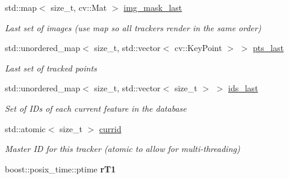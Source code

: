 \begin{DoxyCompactItemize}
\mbox{\label{classov__core_1_1TrackBase_a744c43a93a6e4b5cbd9551280e6a1c97}} 
std\+::map$<$ size\+\_\+t, cv\+::\+Mat $>$ \hyperlink{classov__core_1_1TrackBase_a744c43a93a6e4b5cbd9551280e6a1c97}{img\+\_\+mask\+\_\+last}
\begin{DoxyCompactList}\small\item\em Last set of images (use map so all trackers render in the same order) \end{DoxyCompactList}\item 
\mbox{\label{classov__core_1_1TrackBase_ad44a9e0c34c63b477be5fd2a63a6fb61}} 
std\+::unordered\+\_\+map$<$ size\+\_\+t, std\+::vector$<$ cv\+::\+Key\+Point $>$ $>$ \hyperlink{classov__core_1_1TrackBase_ad44a9e0c34c63b477be5fd2a63a6fb61}{pts\+\_\+last}
\begin{DoxyCompactList}\small\item\em Last set of tracked points \end{DoxyCompactList}\item 
\mbox{\label{classov__core_1_1TrackBase_aaf73cf7b7fd410d8532733875154ed2f}} 
std\+::unordered\+\_\+map$<$ size\+\_\+t, std\+::vector$<$ size\+\_\+t $>$ $>$ \hyperlink{classov__core_1_1TrackBase_aaf73cf7b7fd410d8532733875154ed2f}{ids\+\_\+last}
\begin{DoxyCompactList}\small\item\em Set of I\+Ds of each current feature in the database \end{DoxyCompactList}\item 
\mbox{\label{classov__core_1_1TrackBase_af59db0441bf16f0e7c62d8f3bd09e5f0}} 
std\+::atomic$<$ size\+\_\+t $>$ \hyperlink{classov__core_1_1TrackBase_af59db0441bf16f0e7c62d8f3bd09e5f0}{currid}
\begin{DoxyCompactList}\small\item\em Master ID for this tracker (atomic to allow for multi-\/threading) \end{DoxyCompactList}\item 
\mbox{\label{classov__core_1_1TrackBase_a57cb2bb8f3c607f8b9d4bf2a602ac4e6}} 
boost\+::posix\+\_\+time\+::ptime {\bfseries r\+T1}
\item 
\mbox{\label{classov__core_1_1TrackBase_a73e38b621931e157aaa17495b53867b0}} 

\end{DoxyCompactItemize}
